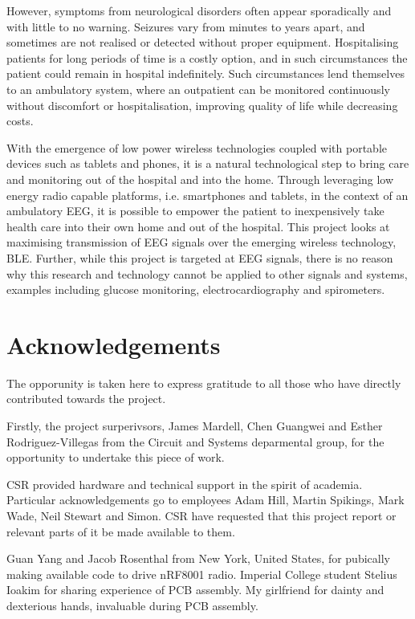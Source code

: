 \documentclass[]{article}
\begin{document}
However, symptoms from neurological disorders often appear sporadically and with little to no warning. Seizures vary from minutes to years apart, and sometimes are not realised or detected without proper equipment. Hospitalising patients for long periods of time is a costly option, and in such circumstances the patient could remain in hospital indefinitely.  Such circumstances lend themselves to an ambulatory system, where an outpatient can be monitored continuously without discomfort or hospitalisation, improving quality of life while decreasing costs. 

With the emergence of low power wireless technologies coupled with portable devices such as tablets and phones, it is a natural technological step to bring care and monitoring out of the hospital and into the home. Through leveraging low energy radio capable platforms, i.e. smartphones and tablets, in the context of an ambulatory EEG, it is possible to empower the patient to inexpensively take health care into their own home and out of the hospital. This project looks at maximising transmission of \ac{EEG} signals over the emerging wireless technology, \ac{BLE}. Further, while this project is targeted at EEG signals, there is no reason why this research and technology cannot be applied to other signals and systems, examples including glucose monitoring, electrocardiography and spirometers.

\cite{Blanco95}
\clearpage
\tableofcontents
\clearpage

\section{Acknowledgements}
The opporunity is taken here to express gratitude to all those who have directly contributed towards the project. 

Firstly, the project surperivsors, James Mardell, Chen Guangwei and Esther Rodriguez-Villegas from the Circuit and Systems deparmental group, for the opportunity to undertake this piece of work.

\ac{CSR} provided hardware and technical support in the spirit of academia. Particular acknowledgements go to employees Adam Hill, Martin Spikings, Mark Wade, Neil Stewart and Simon. CSR have requested that this project report or relevant parts of it be made available to them.

Guan Yang and Jacob Rosenthal from New York, United States, for pubically making available code to drive nRF8001 radio. Imperial College student Stelius Ioakim for sharing experience of \ac{PCB} assembly. My girlfriend for dainty and dexterious hands, invaluable during \ac{PCB} assembly. 
\end{document}
